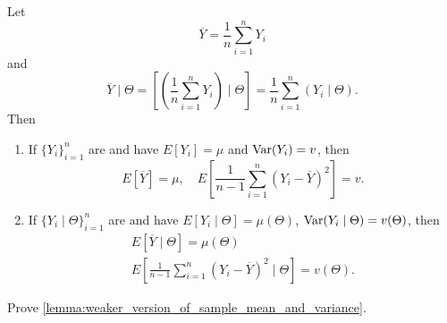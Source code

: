 \documentclass[notoc,notitlepage]{tufte-book}
\begin{document}
\begin{lemma}\label{lemma:weaker_version_of_sample_mean_and_variance}
  Let
  \begin{equation*}
    \overline{Y} = \frac{1}{n} \sum_{i=1}^{n} Y_i
  \end{equation*}
  and
  \begin{equation*}
    \overline{Y} \mid \Theta
    = \left[ \left( \frac{1}{n} \sum_{i=1}^{n}
      Y_i \right) \mid \Theta \right]
    = \frac{1}{n} \sum_{i=1}^{n} (Y_i \mid \Theta).
  \end{equation*}
  Then
  \begin{enumerate}
    \item If $\{ Y_i \}_{i=1}^{n}$ are 
      and have  $E[Y_i] = \mu$
      and  $\operatorname{Var}(Y_i) = v$, then
      \begin{equation*}
        E[\overline{Y}] = \mu,\quad
        E \left[ \frac{1}{n-1} \sum_{i=1}^{n} (Y_i - \overline{Y})^2 \right] =
        v.
      \end{equation*}

    \item If $\{ Y_i \mid \Theta \}_{i=1}^{n}$ are  and
      have  $E[Y_i \mid \Theta] = \mu(\Theta)$,
       $\operatorname{Var}(Y_i \mid \Theta) = v(\Theta)$,
      then
      \begin{gather*}
        E[\overline{Y} \mid \Theta] = \mu(\Theta) \\
        E \left[ \frac{1}{n-1} \sum_{i=1}^{n}
          (Y_i - \overline{Y})^2 \mid \Theta \right] = v(\Theta).
      \end{gather*}
  \end{enumerate}
\end{lemma}

\begin{ex}
  Prove \cref{lemma:weaker_version_of_sample_mean_and_variance}.
\end{ex}
\end{document}
